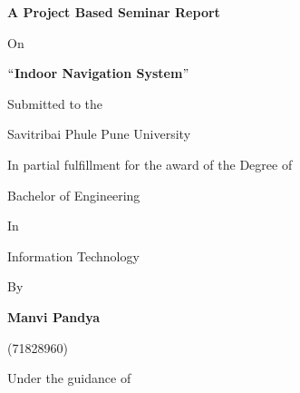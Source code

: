 \documentclass[a4paper, 12pt]{article}
\begin{document}
\begin{titlepage}
\hspace{15pt}
\begin{center}
\textbf{{\Large A Project Based Seminar Report}}
\end{center}

\begin{center}
On
\end{center}

\begin{center}
{\fontsize{18pt}{21.6pt}\selectfont \textbf{\textcolor[HTML]{FF0000}{$``$Indoor Navigation System$"$ }}}
\end{center}

\begin{center}
Submitted to the
\end{center}

\begin{center}
{\large Savitribai Phule Pune University }
\end{center}

\begin{center}
In partial fulfillment for the award of the Degree of
\end{center}

\begin{center}
{\large Bachelor of Engineering }
\end{center}

\begin{center}
In
\end{center}

\begin{center}
{\large Information Technology}
\end{center}

\begin{center}
By
\end{center}

\begin{center}
{\fontsize{16pt}{19.2pt}\selectfont \textbf{\textcolor[HTML]{FF0000}{Manvi Pandya}}\par}
\end{center}

\begin{center}
\textcolor[HTML]{FF0000}{(71828960)}
\end{center}

\begin{center}
Under the guidance of
\end{center}


\end{titlepage}
\end{document}
